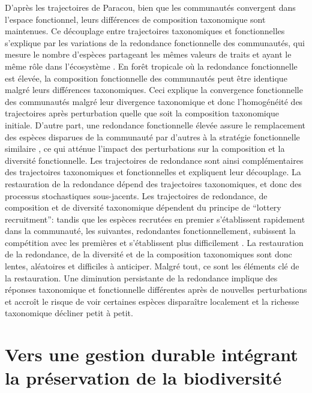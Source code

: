 \documentclass[
  11pt,
  french,
  A4paper,
  extrafontsizes,onecolumn,openright
  ]{memoir}
\begin{document}
D'après les trajectoires de Paracou, bien que les communautés convergent
dans l'espace fonctionnel, leurs différences de composition taxonomique
sont maintenues. Ce découplage entre trajectoires taxonomiques et
fonctionnelles s'explique par les variations de la redondance
fonctionnelle des communautés, qui mesure le nombre d'espèces partageant
les mêmes valeurs de traits et ayant le même rôle dans l'écosystème
\autocite{Bellwood2006}. En forêt tropicale où la redondance
fonctionnelle est élevée, la composition fonctionnelle des communautés
peut être identique malgré leurs différences taxonomiques. Ceci explique
la convergence fonctionnelle des communautés malgré leur divergence
taxonomique et donc l'homogénéité des trajectoires après perturbation
quelle que soit la composition taxonomique initiale. D'autre part, une
redondance fonctionnelle élevée assure le remplacement des espèces
disparues de la communauté par d'autres à la stratégie fonctionnelle
similaire \autocite{Carmona2016}, ce qui atténue l'impact des
perturbations sur la composition et la diversité fonctionnelle. Les
trajectoires de redondance sont ainsi complémentaires des trajectoires
taxonomiques et fonctionnelles et expliquent leur découplage. La
restauration de la redondance dépend des trajectoires taxonomiques, et
donc des processus stochastiques sous-jacents. Les trajectoires de
redondance, de composition et de diversité taxonomique dépendent du
principe de ``lottery recruitment'': tandis que les espèces recrutées en
premier s'établissent rapidement dans la communauté, les suivantes,
redondantes fonctionnellement, subissent la compétition avec les
premières et s'établissent plus difficilement \autocite{Busing2002}. La
restauration de la redondance, de la diversité et de la composition
taxonomiques sont donc lentes, aléatoires et difficiles à anticiper.
Malgré tout, ce sont les éléments clé de la restauration. Une diminution
persistante de la redondance implique des réponses taxonomique et
fonctionnelle différentes après de nouvelles perturbations et accroît le
risque de voir certaines espèces disparaître localement et la richesse
taxonomique décliner petit à petit.

\section{Vers une gestion durable intégrant la préservation de la
biodiversité}\label{vers-une-gestion-durable-integrant-la-preservation-de-la-biodiversite}
\end{document}
